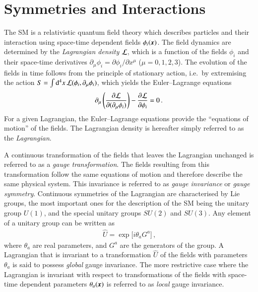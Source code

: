 \section{Symmetries and Interactions}%
\label{sec:theo_symmetries_interactions}

The SM is a relativistic quantum field theory which describes particles and
their interaction using space-time dependent fields $\phi_i(\myvec{x})$. The
field dynamics are determined by the \emph{Lagrangian density} $\mathcal{L}$,
which is a function of the fields $\phi_i$ and their space-time derivatives
$\partial_\mu \phi_i = \partial \phi_i / \partial x^\mu$ ($\mu = 0, 1, 2,
3$). The evolution of the fields in time follows from the principle of
stationary action, i.e.\ by extremising the action
$S = \int \mathrm{d}^4x \, \mathcal{L}(\phi_i, \partial_\mu \phi_i)$, which yields
the Euler--Lagrange equations
\begin{align*}
  \partial_{\mu} \left( \frac{\partial \mathcal{L}}{\partial (\partial_{\mu} \phi_i)} \right) - \frac{\partial \mathcal{L}}{\partial \phi_i} = 0 \,\text{.}
\end{align*}
For a given Lagrangian, the Euler--Lagrange equations provide the ``equations of
motion'' of the fields. The Lagrangian density is hereafter simply referred to
as the \emph{Lagrangian}.

A continuous transformation of the fields that leaves the Lagrangian unchanged
is referred to as a \emph{gauge transformation}. The fields resulting from this
transformation follow the same equations of motion and therefore describe the
same physical system. This invariance is referred to as \emph{gauge invariance}
or \emph{gauge symmetry}.
Continuous symmetries of the Lagrangian are characterised by Lie groups, the
most important ones for the description of the SM being the unitary group
$U(1)$, and the special unitary groups $SU(2)$ and $SU(3)$. Any element of a
unitary group can be written as
\begin{align*}
  \hat{U} = \exp\big[ i \theta_a G^a \big] \,\text{,}
\end{align*}
where $\theta_a$ are real parameters, and $G^a$ are the generators of the group.
A Lagrangian that is invariant to a transformation $\hat{U}$ of the fields with
parameters $\theta_a$ is said to possess \emph{global} gauge invariance. The
more restrictive case where the Lagrangian is invariant with respect to
transformations of the fields with space-time dependent parameters
$\theta_a(\myvec{x})$ is referred to as \emph{local} gauge invariance.

